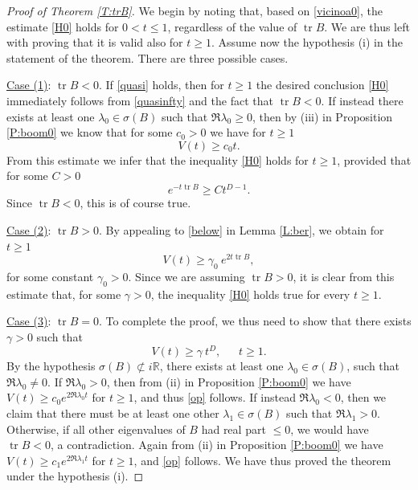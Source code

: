 \documentclass[10pt,a4paper]{amsart}
\def \R {\mathbb{R}}
\newcommand{\la}{\lambda}
\newcommand{\tr}{\operatorname{tr}}
\begin{document}
\begin{proof}[Proof of Theorem \ref{T:trB}]

We begin by noting that, based on \eqref{vicinoa0}, the estimate \eqref{H0} holds for $0<t\le 1$, regardless of the value of $\tr B$. We are thus left with proving that it is valid also for $t\ge 1$.
Assume now the hypothesis (i) in the statement of the theorem. There are three possible cases.

\medskip

\noindent \underline{Case (1)}: $\tr B<0$. If \eqref{quasi} holds, then for $t\ge 1$ the desired conclusion \eqref{H0} immediately follows  from \eqref{quasinfty} and the fact that $\tr B<0$. If instead there exists at least one $\la_0\in \sigma(B)$ such that $\Re \la_0\ge 0$, then by (iii) in Proposition \ref{P:boom0} we know that for some $c_0>0$ we have for $t\ge 1$
\[
V(t) \ge c_0 t.
\]
From this estimate we infer that the inequality \eqref{H0} holds for $t\ge 1$, provided that for some $C>0$
\[
e^{-t \tr B} \ge C t^{D-1}.
\]
Since $\tr B<0$, this is of course true.

\medskip

\noindent \underline{Case (2)}: $\tr B>0$. By appealing to \eqref{below} in Lemma \ref{L:ber}, we obtain for $t\ge 1$ 
\[
V(t) \ge \gamma_0\ e^{2 t \tr B},
\]
for some constant $\gamma_0>0$. Since we are assuming $\tr B>0$, it is clear from this estimate that, for some $\gamma>0$, the inequality \eqref{H0} holds true for every $t\ge 1$.

\medskip

\noindent \underline{Case (3)}: $\tr B = 0$. To complete the proof, we thus need to show that there exists $\gamma >0$ such that
\begin{equation}\label{op}
V(t) \ge \gamma\ t^D,\ \ \ \ \ \ \ t\ge 1.
\end{equation}
By the hypothesis $\sigma(B)\not\subset i \R$, there exists at least one $\la _0\in \sigma(B)$, such that $\Re \la_0 \not=0$. If $\Re \la_0>0$, then from (ii) in Proposition \ref{P:boom0} we have $V(t) \ge c_0 e^{2 \Re \la_0 t}$ for $t\ge 1$, and thus \eqref{op} follows. If instead $\Re \la_0<0$, then we claim that there must be at least one other $\la_1\in \sigma(B)$ such that $\Re \la_1>0$. Otherwise, if all other eigenvalues of $B$ had real part $\le 0$, we would have $\tr B < 0$, a contradiction. Again from (ii) in Proposition \ref{P:boom0} we have $V(t) \ge c_1 e^{2 \Re \la_1 t}$ for $t\ge 1$, and \eqref{op} follows. We have thus proved the theorem under the hypothesis (i).


\end{proof}
\end{document}
